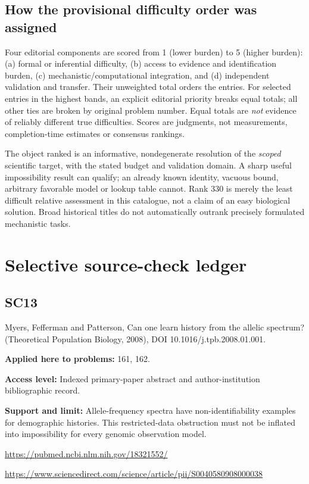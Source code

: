 \documentclass[11pt]{article}
\begin{document}
\subsection*{How the provisional difficulty order was assigned}
Four editorial components are scored from 1 (lower burden) to 5 (higher burden): (a) formal or inferential difficulty, (b) access to evidence and identification burden, (c) mechanistic/computational integration, and (d) independent validation and transfer. Their unweighted total orders the entries. For selected entries in the highest bands, an explicit editorial priority breaks equal totals; all other ties are broken by original problem number. Equal totals are \emph{not} evidence of reliably different true difficulties. Scores are judgments, not measurements, completion-time estimates or consensus rankings.

The object ranked is an informative, nondegenerate resolution of the \emph{scoped} scientific target, with the stated budget and validation domain. A sharp useful impossibility result can qualify; an already known identity, vacuous bound, arbitrary favorable model or lookup table cannot. Rank 330 is merely the least difficult relative assessment in this catalogue, not a claim of an easy biological solution. Broad historical titles do not automatically outrank precisely formulated mechanistic tasks.


\section*{Selective source-check ledger}
\subsection*{SC13}\label{check:SC13}

Myers, Fefferman and Patterson, Can one learn history from the allelic spectrum? (Theoretical Population Biology, 2008), DOI 10.1016/j.tpb.2008.01.001.

\textbf{Applied here to problems:} 161, 162.

\textbf{Access level:} Indexed primary-paper abstract and author-institution bibliographic record.

\textbf{Support and limit:} Allele-frequency spectra have non-identifiability examples for demographic histories. This restricted-data obstruction must not be inflated into impossibility for every genomic observation model.

\url{https://pubmed.ncbi.nlm.nih.gov/18321552/}

\url{https://www.sciencedirect.com/science/article/pii/S0040580908000038}
\end{document}
